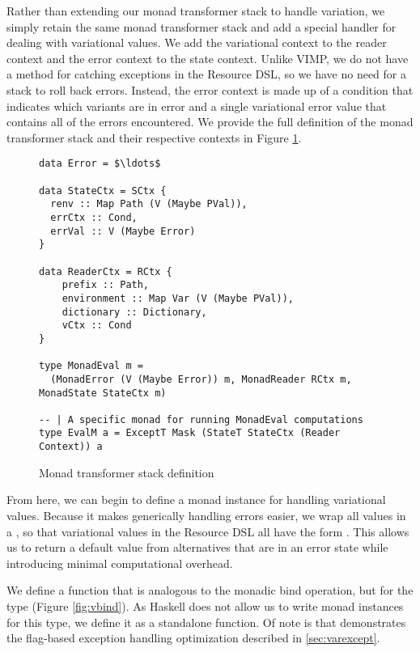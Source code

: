 \documentclass[12pt,oneside]{book}
\begin{document}
Rather than extending our monad transformer stack to handle variation, we simply retain the same monad transformer stack
and add a special handler for dealing with variational values. We add the variational context to the reader context and the error
context to the state context. Unlike VIMP, we do not have a method for catching exceptions in the Resource DSL, so we have
no need for a stack to roll back errors. Instead, the error context is made up of a condition that indicates which variants are in error
and a single variational error value that contains all of the errors encountered. We provide the full definition of the monad transformer
stack and their respective contexts in Figure \ref{fig:transstack}.

\begin{figure}
\begin{lstlisting}
data Error = $\ldots$

data StateCtx = SCtx {
  renv :: Map Path (V (Maybe PVal)),
  errCtx :: Cond,
  errVal :: V (Maybe Error)
}

data ReaderCtx = RCtx {
    prefix :: Path,
    environment :: Map Var (V (Maybe PVal)),
    dictionary :: Dictionary,
    vCtx :: Cond
}

type MonadEval m =
  (MonadError (V (Maybe Error)) m, MonadReader RCtx m, MonadState StateCtx m)

-- | A specific monad for running MonadEval computations
type EvalM a = ExceptT Mask (StateT StateCtx (Reader Context)) a
\end{lstlisting}
\caption{Monad transformer stack definition}
\label{fig:transstack}
\end{figure}

From here, we can begin to define a monad instance for handling variational values.
Because it makes generically handling errors easier, we wrap all values in a ,
so that variational values in the Resource DSL all have the form . This
allows us to return a default value from alternatives that are in an error state while introducing minimal
computational overhead.

We define a function  that is analogous to the monadic bind operation, but for
the type  (Figure \ref{fig:vbind}). As Haskell does not allow us to write monad instances for this
type, we define it as a standalone function. Of note is that  demonstrates the flag-based exception handling optimization
described in \ref{sec:varexcept}.
\end{document}
